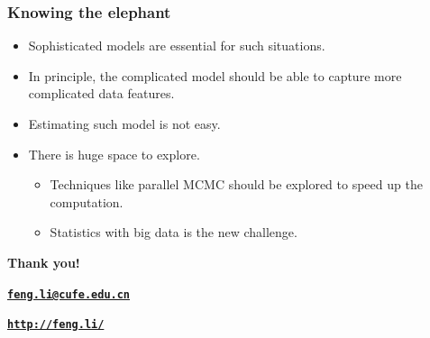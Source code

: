 \documentclass{beamer}
\begin{document}
\begin{frame}
  \frametitle{Knowing the elephant}

  \begin{itemize}
  \item Sophisticated models are essential for such situations.
  \item In principle, the complicated model should be able to capture more
    complicated data features.
  \item Estimating such model is not easy.
  \item There is huge space to explore.
    \begin{itemize}
    \item Techniques like parallel MCMC should be explored to speed up the
      computation.
    \item Statistics with big data is the new challenge.
    \end{itemize}
  \end{itemize}
\end{frame}



\begin{frame}[plain]
  \addtocounter{framenumber}{-1}
  \begin{center}
    {\color{SUblue} \textbf{\Huge Thank you!}}
    \vspace{1cm}

    {\texttt{\textbf{\url{feng.li@cufe.edu.cn}}}}

    \vspace{1cm}

    {\texttt{\textbf{\url{http://feng.li/}}}}

  \end{center}
\end{frame}
\end{document}
